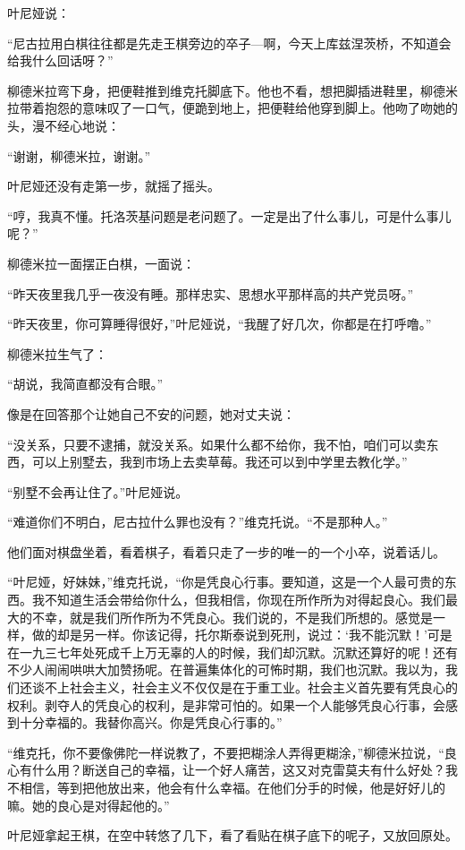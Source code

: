 叶尼娅说：

“尼古拉用白棋往往都是先走王棋旁边的卒子—啊，今天上库兹涅茨桥，不知道会给我什么回话呀？”

柳德米拉弯下身，把便鞋推到维克托脚底下。他也不看，想把脚插进鞋里，柳德米拉带着抱怨的意味叹了一口气，便跪到地上，把便鞋给他穿到脚上。他吻了吻她的头，漫不经心地说：

“谢谢，柳德米拉，谢谢。”

叶尼娅还没有走第一步，就摇了摇头。

“哼，我真不懂。托洛茨基问题是老问题了。一定是出了什么事儿，可是什么事儿呢？”

柳德米拉一面摆正白棋，一面说：

“昨天夜里我几乎一夜没有睡。那样忠实、思想水平那样高的共产党员呀。”

“昨天夜里，你可算睡得很好，”叶尼娅说，“我醒了好几次，你都是在打呼噜。”

柳德米拉生气了：

“胡说，我简直都没有合眼。”

像是在回答那个让她自己不安的问题，她对丈夫说：

“没关系，只要不逮捕，就没关系。如果什么都不给你，我不怕，咱们可以卖东西，可以上别墅去，我到市场上去卖草莓。我还可以到中学里去教化学。”

“别墅不会再让住了。”叶尼娅说。

“难道你们不明白，尼古拉什么罪也没有？”维克托说。“不是那种人。”

他们面对棋盘坐着，看着棋子，看着只走了一步的唯一的一个小卒，说着话儿。

“叶尼娅，好妹妹，”维克托说，“你是凭良心行事。要知道，这是一个人最可贵的东西。我不知道生活会带给你什么，但我相信，你现在所作所为对得起良心。我们最大的不幸，就是我们所作所为不凭良心。我们说的，不是我们所想的。感觉是一样，做的却是另一样。你该记得，托尔斯泰说到死刑，说过：‘我不能沉默！’可是在一九三七年处死成千上万无辜的人的时候，我们却沉默。沉默还算好的呢！还有不少人闹闹哄哄大加赞扬呢。在普遍集体化的可怖时期，我们也沉默。我以为，我们还谈不上社会主义，社会主义不仅仅是在于重工业。社会主义首先要有凭良心的权利。剥夺人的凭良心的权利，是非常可怕的。如果一个人能够凭良心行事，会感到十分幸福的。我替你高兴。你是凭良心行事的。”

“维克托，你不要像佛陀一样说教了，不要把糊涂人弄得更糊涂，”柳德米拉说，“良心有什么用？断送自己的幸福，让一个好人痛苦，这又对克雷莫夫有什么好处？我不相信，等到把他放出来，他会有什么幸福。在他们分手的时候，他是好好儿的嘛。她的良心是对得起他的。”

叶尼娅拿起王棋，在空中转悠了几下，看了看贴在棋子底下的呢子，又放回原处。

